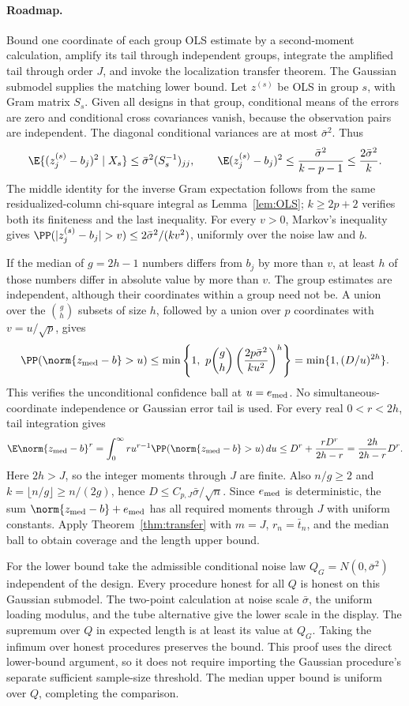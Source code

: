 \paragraph{Roadmap.} Bound one coordinate of each group OLS estimate by a second-moment calculation, amplify its tail through independent groups, integrate the amplified tail through order $J$, and invoke the localization transfer theorem. The Gaussian submodel supplies the matching lower bound.
Let $z^{(s)}$ be OLS in group $s$, with Gram matrix $S_s$. Given all designs in that group, conditional means of the errors are zero and conditional cross covariances vanish, because the observation pairs are independent. The diagonal conditional variances are at most $\bar\sigma^2$. Thus
\[
 \E\{(z_j^{(s)}-b_j)^2\mid X_s\}
 \le\bar\sigma^2(S_s^{-1})_{jj},\qquad
 \E(z_j^{(s)}-b_j)^2
 \le\frac{\bar\sigma^2}{k-p-1}\le\frac{2\bar\sigma^2}{k}.
\]
The middle identity for the inverse Gram expectation follows from the same residualized-column chi-square integral as Lemma~\ref{lem:OLS}; $k\ge2p+2$ verifies both its finiteness and the last inequality. For every $v>0$, Markov's inequality gives
$\PP(|z_j^{(s)}-b_j|>v)\le2\bar\sigma^2/(kv^2)$, uniformly over the noise law and $b$.

If the median of $g=2h-1$ numbers differs from $b_j$ by more than $v$, at least $h$ of those numbers differ in absolute value by more than $v$. The group estimates are independent, although their coordinates within a group need not be. A union over the $\binom gh$ subsets of size $h$, followed by a union over $p$ coordinates with $v=u/\sqrt p$, gives
\[
 \PP(\norm{z_{\rm med}-b}>u)
 \le\min\left\{1,\ p\binom gh
       \left(\frac{2p\bar\sigma^2}{ku^2}\right)^h\right\}
 =\min\{1,(D/u)^{2h}\}.
\]
This verifies the unconditional confidence ball at $u=e_{\rm med}$. No simultaneous-coordinate independence or Gaussian error tail is used. For every real $0<r<2h$, tail integration gives
\[
 \E\norm{z_{\rm med}-b}^r
 =\int_0^\infty r u^{r-1}\PP(\norm{z_{\rm med}-b}>u)\,du
 \le D^r+\frac{rD^r}{2h-r}
 =\frac{2h}{2h-r}D^r.
\]
Here $2h>J$, so the integer moments through $J$ are finite. Also $n/g\ge2$ and $k=\lfloor n/g\rfloor\ge n/(2g)$, hence $D\le C_{p,J}\bar\sigma/\sqrt n$. Since $e_{\rm med}$ is deterministic, the sum $\norm{z_{\rm med}-b}+e_{\rm med}$ has all required moments through $J$ with uniform constants. Apply Theorem~\ref{thm:transfer} with $m=J$, $r_n=\bar t_n$, and the median ball to obtain coverage and the length upper bound.

For the lower bound take the admissible conditional noise law $Q_G=N(0,\bar\sigma^2)$ independent of the design. Every procedure honest for all $Q$ is honest on this Gaussian submodel. The two-point calculation at noise scale $\bar\sigma$, the uniform loading modulus, and the tube alternative give the lower scale in the display. The supremum over $Q$ in expected length is at least its value at $Q_G$. Taking the infimum over honest procedures preserves the bound. This proof uses the direct lower-bound argument, so it does not require importing the Gaussian procedure's separate sufficient sample-size threshold. The median upper bound is uniform over $Q$, completing the comparison.
